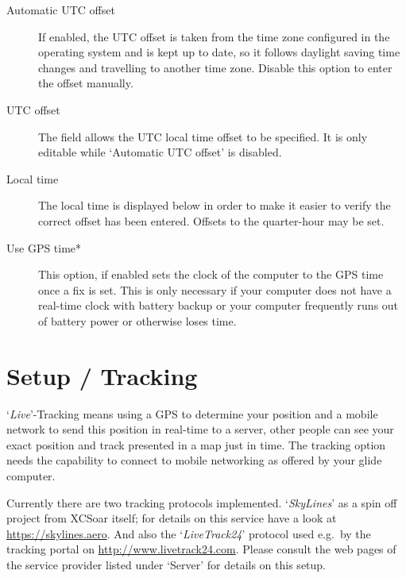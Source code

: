 \begin{description}
\item[Automatic UTC offset]  If enabled, the UTC offset is taken from the time zone
  configured in the operating system and is kept up to date, so it follows daylight
  saving time changes and travelling to another time zone.  Disable this option to
  enter the offset manually.
\item[UTC offset]  The field allows the UTC local time offset to be specified.  It is
  only editable while `Automatic UTC offset' is disabled.
\item[Local time]  The local time is displayed below in order to make it easier to verify
  the correct offset has been entered.  Offsets to the quarter-hour may be set.
\item[Use GPS time*] This option, if enabled sets the clock of the computer to 
  the GPS time once a fix is set. This is only necessary if your computer does 
  not have a real-time clock with battery backup or your computer 
  frequently runs out of battery power or otherwise loses time.
\end{description}


\section{Setup / Tracking}

`{\it Live}'-Tracking means using a GPS to determine your position and a mobile 
network to send this position in real-time to a server, other people can see 
your exact position and track presented in a map just in time.
The tracking option needs the capability to connect to mobile networking as offered by 
your glide computer.

Currently there are two tracking protocols implemented. `{\em SkyLines}' as a spin 
off project from XCSoar itself; for details on this service have a look at 
\url{https://skylines.aero}. 
And also the `{\em LiveTrack24}' protocol used e.g.\ by the tracking
portal on \url{http://www.livetrack24.com}.  
Please consult the web pages of the service provider listed under `Server' 
for details on this setup.

